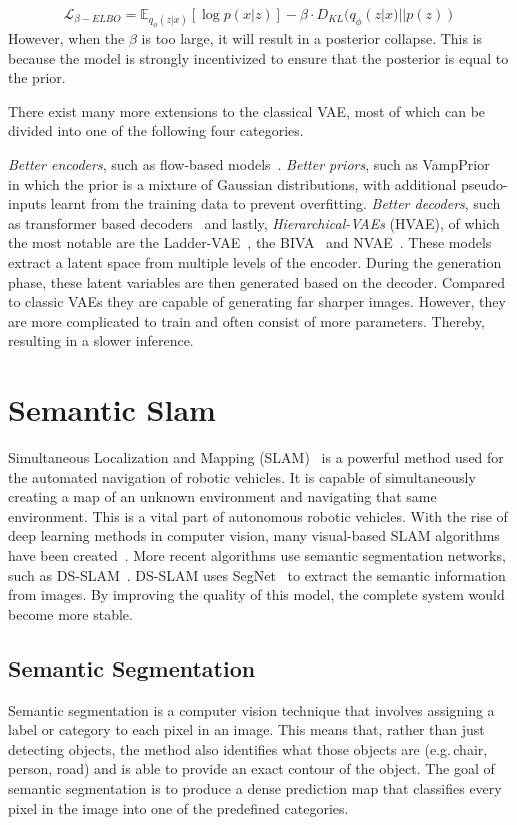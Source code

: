 \begin{equation}
    \mathcal{L}_{\beta-ELBO} = \mathbb{E}_{q_{\phi}(z|x)}[\log p(x|z)] - \beta \cdot D_{KL}(q_{\phi}(z|x) || p(z))
    \label{eq:beta-elbo}
\end{equation}
However, when the $\beta$ is too large, it will result in a posterior collapse. This is because the model is strongly incentivized to ensure that the posterior is equal to the prior.

There exist many more extensions to the classical VAE, most of which can be divided into one of the following four categories.

\emph{Better encoders}, such as flow-based models~\cite{Berg2018SylvesterNF,tomczak2017improving,rezende2015variational}. \emph{Better priors}, such as VampPrior~\cite{tomczak2018vae} in which the prior is a mixture of Gaussian distributions, with additional pseudo-inputs learnt from the training data to prevent overfitting. \emph{Better decoders}, such as transformer based decoders~\cite{Henderson2022AVA,9054554} and lastly, \emph{Hierarchical-VAEs} (HVAE), of which the most notable are the Ladder-VAE~\cite{NIPS2016_6ae07dcb}, the BIVA~\cite{maaloe2019biva} and NVAE~\cite{vahdat2020nvae}. These models extract a latent space from multiple levels of the encoder. During the generation phase, these latent variables are then generated based on the decoder. Compared to classic VAEs they are capable of generating far sharper images. However, they are more complicated to train and often consist of more parameters. Thereby, resulting in a slower inference.


\section{Semantic Slam}
Simultaneous Localization and Mapping (SLAM)~\cite{chatila1985position} is a powerful method used for the automated navigation of robotic vehicles. It is capable of simultaneously creating a map of an unknown environment and navigating that same environment. This is a vital part of autonomous robotic vehicles. With the rise of deep learning methods in computer vision, many visual-based SLAM algorithms have been created~\cite{taketomi2017visual}. More recent algorithms use semantic segmentation networks, such as DS-SLAM~\cite{yu2018ds}. DS-SLAM uses SegNet~\cite{badri2017segnet} to extract the semantic information from images. By improving the quality of this model, the complete system would become more stable.

\subsection{Semantic Segmentation}
Semantic segmentation is a computer vision technique that involves assigning a label or category to each pixel in an image. This means that, rather than just detecting objects, the method also identifies what those objects are (e.g.\,chair, person, road) and is able to provide an exact contour of the object. The goal of semantic segmentation is to produce a dense prediction map that classifies every pixel in the image into one of the predefined categories.

